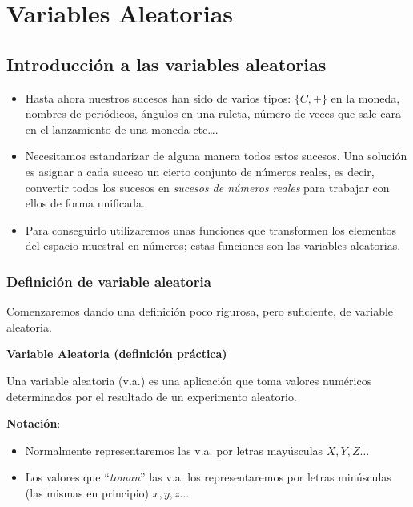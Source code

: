 \documentclass[
  letterpaper,
  DIV=11,
  numbers=noendperiod]{scrreprt}
\providecommand{\tightlist}{%
  \setlength{\itemsep}{0pt}\setlength{\parskip}{0pt}}\usepackage{longtable,booktabs,array}
\begin{document}

\hypertarget{variables-aleatorias}{%
\chapter{Variables Aleatorias}\label{variables-aleatorias}}

\hypertarget{introducciuxf3n-a-las-variables-aleatorias}{%
\section{Introducción a las variables
aleatorias}\label{introducciuxf3n-a-las-variables-aleatorias}}

\begin{itemize}
\tightlist
\item
  Hasta ahora nuestros sucesos han sido de varios tipos: \(\{C,+\}\) en
  la moneda, nombres de periódicos, ángulos en una ruleta, número de
  veces que sale cara en el lanzamiento de una moneda etc\ldots.
\item
  Necesitamos estandarizar de alguna manera todos estos sucesos. Una
  solución es asignar a cada suceso un cierto conjunto de números
  reales, es decir, convertir todos los sucesos en \emph{sucesos de
  números reales} para trabajar con ellos de forma unificada.
\item
  Para conseguirlo utilizaremos unas funciones que transformen los
  elementos del espacio muestral en números; estas funciones son las
  variables aleatorias.
\end{itemize}

\hypertarget{definiciuxf3n-de-variable-aleatoria}{%
\subsection{Definición de variable
aleatoria}\label{definiciuxf3n-de-variable-aleatoria}}

Comenzaremos dando una definición poco rigurosa, pero suficiente, de
variable aleatoria.

\textbf{Variable Aleatoria (definición práctica)}

Una variable aleatoria (v.a.) es una aplicación que toma valores
numéricos determinados por el resultado de un experimento aleatorio.

\textbf{Notación}:

\begin{itemize}
\tightlist
\item
  Normalmente representaremos las v.a. por letras mayúsculas
  \(X,Y,Z\ldots\)
\item
  Los valores que ``\emph{toman}'' las v.a. los representaremos por
  letras minúsculas (las mismas en principio) \(x,y,z\ldots\)
\end{itemize}
\end{document}
